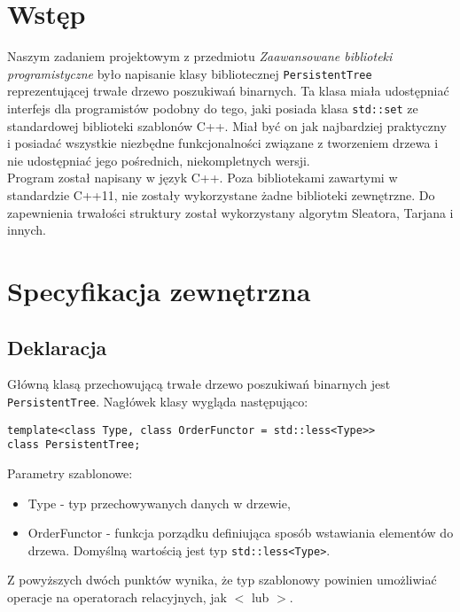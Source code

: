 \documentclass[a4paper,twoside]{article}
\begin{document}
	
	
	\section{Wstęp}
	Naszym zadaniem projektowym z przedmiotu \textit{Zaawansowane biblioteki programistyczne} było napisanie klasy bibliotecznej \lstinline|PersistentTree| reprezentującej trwałe drzewo poszukiwań binarnych. Ta klasa miała udostępniać interfejs dla programistów podobny do tego, jaki posiada klasa \lstinline|std::set| ze standardowej biblioteki szablonów C++. Miał być on jak najbardziej praktyczny i posiadać wszystkie niezbędne funkcjonalności związane z tworzeniem drzewa i nie udostępniać jego pośrednich, niekompletnych wersji.\\
	Program został napisany w język C++. Poza bibliotekami zawartymi w standardzie C++11, nie zostały wykorzystane żadne biblioteki zewnętrzne. Do zapewnienia trwałości struktury został wykorzystany algorytm Sleatora, Tarjana i innych.
	
	\section{Specyfikacja zewnętrzna}
	\subsection{Deklaracja}
	Główną klasą przechowującą trwałe drzewo poszukiwań binarnych jest \lstinline|PersistentTree|. Nagłówek klasy wygląda następująco:
	\begin{lstlisting}
template<class Type, class OrderFunctor = std::less<Type>>
class PersistentTree;
	\end{lstlisting}
	Parametry szablonowe:
	 \begin{itemize}
	 	\item Type - typ przechowywanych danych w drzewie,
	 	\item OrderFunctor - funkcja porządku definiująca sposób wstawiania elementów do drzewa. Domyślną wartością jest typ \lstinline|std::less<Type>|.
	 \end{itemize}
	 Z powyższych dwóch punktów wynika, że typ szablonowy powinien umożliwiać operacje na operatorach relacyjnych, jak $ < $ lub $ > $.
\end{document}
